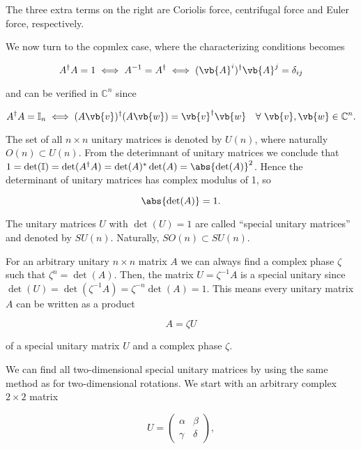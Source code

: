 \documentclass[a4paper,12pt]{report}
\begin{document}
The three extra terms on the right are Coriolis force, centrifugal force and Euler force, respectively.

We now turn to the copmlex case, where the characterizing conditions becomes

\begin{equation}
    A^{\dagger} A = 1 \iff A^{-1} = A^{\dagger} \iff (\vb{A} ^{i} )^{\dagger} \vb{A} ^{j} = \delta _{ij}
\end{equation}

and can be verified in \(\mathbb{C}^{n} \) since 

\begin{equation}
    A^{\dagger} A = \mathbb{I}_{n} \iff (A\vb{v} )^{\dagger} (A\vb{w} ) = \vb{v} ^{\dagger} \vb{w} ~~~\forall ~ \vb{v} ,\vb{w} \in \mathbb{C}^{n}.   
\end{equation}

The set of all \(n \times  n\) unitary matrices is denoted by \(U(n)\), where naturally \(O(n) \subset U(n)\). From the deterimnant of unitary matrices we conclude that \(1 = \det (\mathbb{I}) = \det (A^{\dagger} A) = \det (A)^*\det (A) = \abs{\det (A)}^2 \). Hence the determinant of unitary matrices has complex modulus of 1, so

\begin{equation}
    \abs{\det (A)} = 1. 
\end{equation}

The unitary matrices \(U\) with \(\det (U) = 1\) are called ``special unitary matrices'' and denoted by \(SU(n)\). Naturally, \(SO(n) \subset SU(n)\). 

For an arbitrary unitary \(n \times  n\) matrix \(A\) we can always find a complex phase \(\zeta \) such that \(\zeta ^{n} = \det (A) \). Then, the matrix \(U = \zeta ^{-1} A\) is a special unitary since \(\det (U) = \det (\zeta ^{-1} A) = \zeta ^{-n} \det (A) = 1 \). This means every unitary matrix \(A\) can be written as a product

\begin{equation}
    A = \zeta U
\end{equation}

of a special unitary matrix \(U\) and a complex phase \(\zeta \).  

We can find all two-dimensional special unitary matrices by using the same method as for two-dimensional rotations. We start with an arbitrary complex \(2 \times 2\) matrix

\begin{equation}
U = \begin{pmatrix}
\alpha & \beta \\
\gamma & \delta
\end{pmatrix},
\end{equation}
\end{document}
